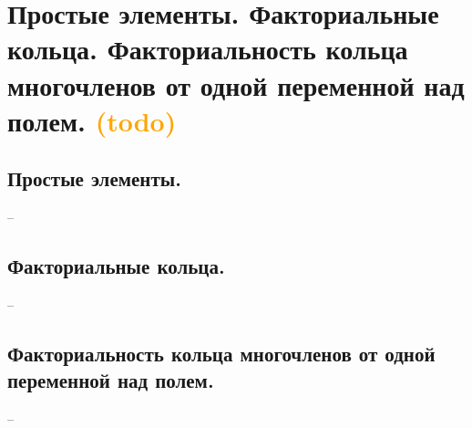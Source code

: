 \section{Простые элементы. Факториальные кольца. Факториальность кольца многочленов от одной переменной над полем. \textcolor{orange}{(todo)}}

\subsection{Простые элементы.}
--

\subsection{Факториальные кольца.}
--

\subsection{Факториальность кольца многочленов от одной переменной над полем.}
--
